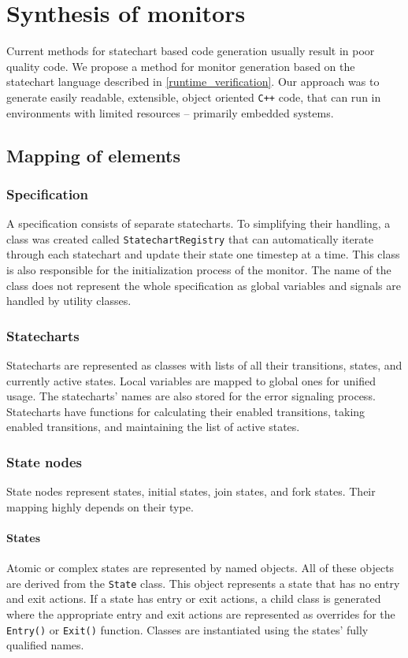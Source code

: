 \chapter{Synthesis of monitors}
Current methods for statechart based code generation usually result in poor quality code. We propose a method for monitor generation based on the statechart language described in \vref{runtime_verification}. Our approach was to generate easily readable, extensible, object oriented \verb!C++! code, that can run in environments with limited resources -- primarily embedded systems.
\section{Mapping of elements}
  \subsection{Specification}
A specification consists of separate statecharts. To simplifying their handling, a class was created called \verb!StatechartRegistry! that can automatically iterate through each statechart and update their state one timestep at a time. This class is also responsible for the initialization process of the monitor. The name of the class does not represent the whole specification as global variables and signals are handled by utility classes.
  \subsection{Statecharts}
Statecharts are represented as classes with lists of all their transitions, states, and currently active states. Local variables are mapped to global ones for unified usage. The statecharts' names are also stored for the error signaling process. Statecharts have functions for calculating their enabled transitions, taking enabled transitions, and maintaining the list of active states.
  \subsection{State nodes}
State nodes represent states, initial states, join states, and fork states. Their mapping highly depends on their type.
    \subsubsection{States}
Atomic or complex states are represented by named objects. All of these objects are derived from the \verb!State! class. This object represents a state that has no entry and exit actions. If a state has entry or exit actions, a child class is generated where the appropriate entry and exit actions are represented as overrides for the \verb!Entry()! or \verb!Exit()! function. Classes are instantiated using the states' fully qualified names.
